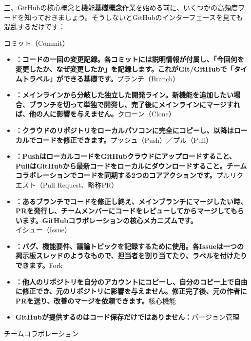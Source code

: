 三、GitHubの核心概念と機能\textbf{基礎概念}作業を始める前に、いくつかの高頻度ワードを知っておきましょう。そうしないとGitHubのインターフェースを見ても混乱するだけです：



コミット（Commit）

\begin{itemize}
  \item \textbf{：コードの一回の変更記録。各コミットには説明情報が付属し、「今回何を変更したか、なぜ変更したか」を記録します。これがGit/GitHubで「タイムトラベル」ができる基礎です。}ブランチ（Branch）
  \item \textbf{：メインラインから分岐した独立した開発ライン。新機能を追加したい場合、ブランチを切って単独で開発し、完了後にメインラインにマージすれば、他の人に影響を与えません。}クローン（Clone）
  \item \textbf{：クラウドのリポジトリをローカルパソコンに完全にコピーし、以降はローカルでコードを修正できます。}プッシュ（Push）／プル（Pull）
  \item \textbf{：PushはローカルコードをGitHubクラウドにアップロードすること、PullはGitHubから最新コードをローカルにダウンロードすること。チームコラボレーションでコードを同期する2つのコアアクションです。}プルリクエスト（Pull Request、略称PR）
  \item \textbf{：あるブランチでコードを修正し終え、メインブランチにマージしたい時、PRを発行し、チームメンバーにコードをレビューしてからマージしてもらいます。GitHubコラボレーションの核心メカニズムです。}イシュー（Issue）
  \item \textbf{：バグ、機能要件、議論トピックを記録するために使用。各Issueは一つの掲示板スレッドのようなもので、担当者を割り当てたり、ラベルを付けたりできます。}Fork
  \item \textbf{：他人のリポジトリを自分のアカウントにコピーし、自分のコピー上で自由に修正でき、元のリポジトリに影響を与えません。修正完了後、元の作者にPRを送り、改善のマージを依頼できます。}核心機能
  \item \textbf{GitHubが提供するのはコード保存だけではありません：}バージョン管理
\end{itemize}


チームコラボレーション

